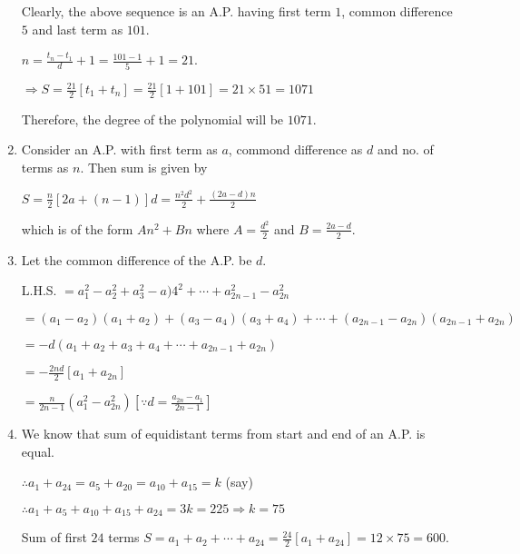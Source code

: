 \begin{enumerate}
  Clearly, the above sequence is an A.P. having first term $1$, common difference $5$ and last term as $101$.

  $n = \frac{t_n - t_1}{d} + 1 = \frac{101 - 1}{5} + 1 = 21$.

  $\Rightarrow S = \frac{21}{2}[t_1 + t_n] = \frac{21}{2}[1 + 101] = 21\times 51 = 1071$

  Therefore, the degree of the polynomial will be $1071$.
\item Consider an A.P. with first term as $a$, commond difference as $d$ and no. of terms as $n$. Then sum is given by

  $S = \frac{n}{2}[2a + (n - 1)]d = \frac{n^2d^2}{2} + \frac{(2a - d)n}{2}$

  which is of the form $An^2 + Bn$ where $A = \frac{d^2}{2}$ and $B = \frac{2a - d}{2}$.
\item Let the common difference of the A.P. be $d$.

  L.H.S. $= a_1^2 - a_2^2 + a_3^2 - a)4^2 + \cdots + a_{2n - 1}^2 -a_{2n}^2$

  $= (a_1 - a_2)(a_1 + a_2) + (a_3 - a_4)(a_3 + a_4) + \cdots + (a_{2n - 1} - a_{2n})(a_{2n - 1} + a_{2n})$

  $= -d(a_1 + a_2 + a_3 + a_4 + \cdots + a_{2n - 1} + a_{2n})$

  $= -\frac{2nd}{2}[a_1 + a_{2n}]$

  $= \frac{n}{2n - 1}(a_1^2 - a_{2n}^2)\left[\because d = \frac{a_{2n} - a_1}{2n - 1}\right]$
\item We know that sum of equidistant terms from start and end of an A.P. is equal.

  $\therefore a_1 + a_{24} = a_5 + a_{20} = a_{10} + a_{15} = k$ (say)

  $\therefore a_1 + a_5 + a_{10} + a_{15} + a_{24} = 3k = 225 \Rightarrow k = 75$

  Sum of first $24$ terms $S = a_1 + a_2 + \cdots + a_{24} = \frac{24}{2}[a_1 + a_{24}] = 12\times75 = 600$.
\end{enumerate}
